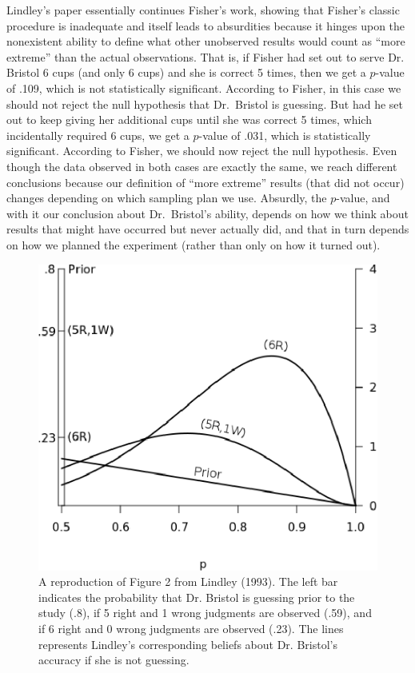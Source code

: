 Lindley's paper essentially continues Fisher's work, showing that Fisher's classic procedure is inadequate and itself leads to absurdities because it hinges upon the nonexistent ability to define what other unobserved results would count as ``more extreme'' than the actual observations. That is, if Fisher had set out to serve Dr. Bristol 6 cups (and only 6 cups) and she is correct 5 times, then we get a $p$-value of .109, which is not statistically significant.  According to Fisher, in this case we should not reject the null hypothesis that Dr.\ Bristol is guessing. But had he set out to keep giving her additional cups until she was correct 5 times, which incidentally required 6 cups, we get a $p$-value of .031, which is statistically significant.  According to Fisher, we should now reject the null hypothesis. Even though the data observed in both cases are exactly the same, we reach different conclusions because our definition of ``more extreme'' results (that did not occur) changes depending on which sampling plan we use. Absurdly, the $p$-value, and with it our conclusion about Dr.\ Bristol's ability, depends on how we think about results that might have occurred but never actually did, and that in turn depends on how we planned the experiment (rather than only on how it turned out).

\begin{figure}[!t]
\centering
\includegraphics[scale=.9]
{figs/8st_figure1_Lindley1993}
\caption{A reproduction of Figure 2 from Lindley (1993). The left bar indicates the probability that Dr. Bristol is guessing prior to the study (.8), if 5 right and 1 wrong judgments are observed (.59), and if 6 right and 0 wrong judgments are observed (.23). The lines represents Lindley's corresponding beliefs about Dr. Bristol's accuracy if she is not guessing.}
\end{figure}

